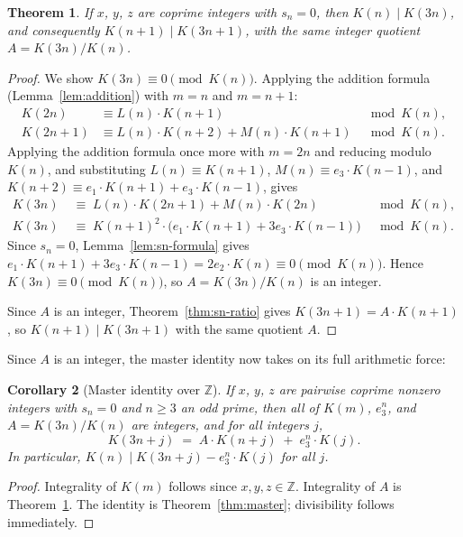 \documentclass[12pt]{article}
\newtheorem{theorem}{Theorem}[section]
\newtheorem{corollary}[theorem]{Corollary}
\theoremstyle{definition}
\begin{document}
	\begin{theorem}
		\label{thm:flt-divisibility}
		If $x$, $y$, $z$ are coprime integers with $s_n = 0$, then
		$K(n) \mid K(3n)$, and consequently $K(n+1) \mid K(3n+1)$, with
		the same integer quotient $A = K(3n)/K(n)$.
	\end{theorem}
	\begin{proof}
		We show $K(3n) \equiv 0 \pmod{K(n)}$.  Applying the addition formula
		(Lemma~\ref{lem:addition}) with $m = n$ and $m=n+1$:
		\begin{align*}
			K(2n)   &\equiv L(n) \cdot K(n+1) &\mod K(n), \\
			K(2n+1) &\equiv L(n) \cdot K(n+2) + M(n) \cdot K(n+1) &\mod K(n).
		\end{align*}
		Applying the addition formula once more with $m = 2n$ and reducing modulo $K(n)$, and substituting
		$L(n) \equiv K(n+1)$, $M(n) \equiv e_3 \cdot K(n-1)$,
		and $K(n+2) \equiv e_1 \cdot K(n+1) + e_3 \cdot K(n-1)$, gives
		\begin{align*}
			K(3n) &\;\equiv\; L(n) \cdot K(2n+1) + M(n) \cdot K(2n) &\mod K(n),\\
			K(3n) &\;\equiv\; K(n+1)^2 \cdot \bigl(e_1 \cdot K(n+1) + 3e_3 \cdot K(n-1)\bigr) &\mod K(n).
		\end{align*}
		Since $s_n = 0$, Lemma~\ref{lem:sn-formula} gives
		$e_1 \cdot K(n+1) + 3e_3 \cdot K(n-1) = 2e_2 \cdot K(n) \equiv 0 \pmod{K(n)}$.
		Hence $K(3n) \equiv 0 \pmod{K(n)}$, so $A = K(3n)/K(n)$ is an integer.
		
		Since $A$ is an integer, Theorem~\ref{thm:sn-ratio} gives
		$K(3n+1) = A \cdot K(n+1)$, so $K(n+1) \mid K(3n+1)$ with the same
		quotient $A$.
	\end{proof}
	
	Since $A$ is an integer, the master identity now takes on its full arithmetic force:
	
	\begin{corollary}[Master identity over $\mathbb{Z}$]
		\label{cor:master-int}
		If $x$, $y$, $z$ are pairwise coprime nonzero integers with $s_n = 0$
		and $n \geq 3$ an odd prime, then all of $K(m)$, $e_3^n$, and
		$A = K(3n)/K(n)$ are integers, and for all integers $j$,
		\[
		K(3n+j) \;=\; A \cdot K(n+j) \;+\; e_3^n \cdot K(j).
		\]
		In particular, $K(n) \mid K(3n+j) - e_3^n \cdot K(j)$ for all $j$.
	\end{corollary}
	\begin{proof}
		Integrality of $K(m)$ follows since $x,y,z \in \mathbb{Z}$.
		Integrality of $A$ is Theorem~\ref{thm:flt-divisibility}.
		The identity is Theorem~\ref{thm:master}; divisibility follows immediately.
	\end{proof}
	
\end{document}
